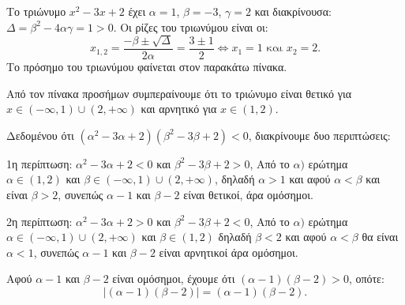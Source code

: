 
\begin{alist}
\item Το τριώνυμο $x^2 - 3x + 2$ έχει $\alpha = 1$, $\beta = -3$, $\gamma = 2$ και διακρίνουσα: $\Delta = \beta^2 - 4\alpha\gamma = 1 > 0$.
Οι ρίζες του τριωνύμου είναι οι:
\[x_{1,2} = \dfrac{-\beta \pm \sqrt{\Delta}}{2\alpha} = \dfrac{3 \pm 1}{2} \Leftrightarrow x_1 = 1 \text{ και } x_2 = 2.\]
Το πρόσημο του τριωνύμου φαίνεται στον παρακάτω πίνακα.

\begin{center}
\end{center}

Από τον πίνακα προσήμων συμπεραίνουμε ότι το τριώνυμο είναι θετικό για
$x \in (-\infty, 1) \cup (2, +\infty)$ και αρνητικό για $x \in (1, 2)$.

\item 
\begin{rlist}
\item Δεδομένου ότι $(\alpha^2 - 3\alpha + 2)(\beta^2 - 3\beta + 2) < 0$, διακρίνουμε δυο περιπτώσεις:

1η περίπτωση: $\alpha^2 - 3\alpha + 2 < 0$ και $\beta^2 - 3\beta + 2 > 0$,
Από το $\alpha)$ ερώτημα $\alpha \in (1, 2)$ και $\beta \in (-\infty, 1) \cup (2, +\infty)$, δηλαδή $\alpha > 1$ και αφού $\alpha < \beta$
και είναι $\beta > 2$, συνεπώς $\alpha - 1$ και $\beta - 2$ είναι θετικοί, άρα ομόσημοι.

2η περίπτωση: $\alpha^2 - 3\alpha + 2 > 0$ και $\beta^2 - 3\beta + 2 < 0$,
Από το $\alpha)$ ερώτημα $\alpha \in (-\infty, 1) \cup (2, +\infty)$ και $\beta \in (1, 2)$ δηλαδή $\beta < 2$ και αφού $\alpha < \beta$
θα είναι $\alpha < 1$, συνεπώς $\alpha - 1$ και $\beta - 2$ είναι αρνητικοί άρα ομόσημοι.

\item Αφού $\alpha - 1$ και $\beta - 2$ είναι ομόσημοι, έχουμε ότι $(\alpha - 1)(\beta - 2) > 0$, οπότε:
\[|(\alpha - 1)(\beta - 2)| = (\alpha - 1)(\beta - 2).\]
\end{rlist}
\end{alist}

